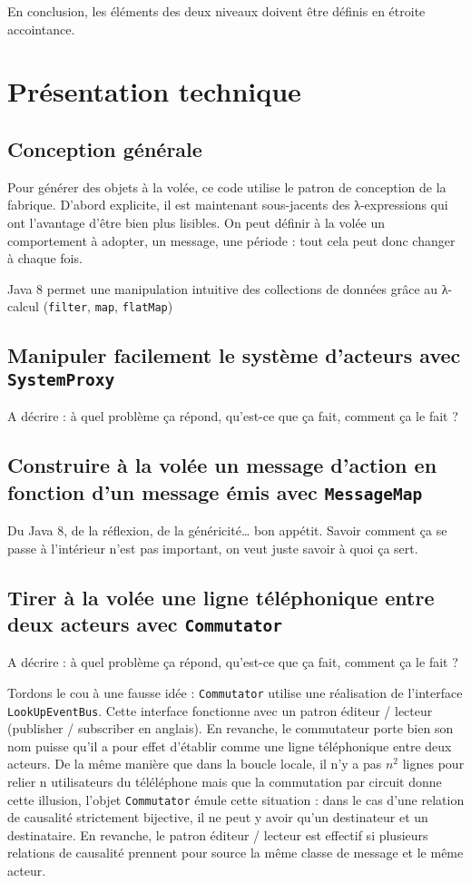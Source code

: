 \documentclass[11pt]{article}
\begin{document}
En conclusion, les éléments des deux niveaux doivent être définis en étroite accointance.

\section{Présentation technique}

\subsection{Conception générale}

Pour générer des objets à la volée, ce code utilise le patron de conception de la fabrique. D'abord explicite, il est maintenant sous-jacents des λ-expressions qui ont l'avantage d'être bien plus lisibles. On peut définir à la volée un comportement à adopter, un message, une période : tout cela peut donc changer à chaque fois. 

Java 8 permet une manipulation intuitive des collections de données grâce au λ-calcul (\texttt{filter}, \texttt{map}, \texttt{flatMap})

\subsection{Manipuler facilement le système d'acteurs avec \texttt{SystemProxy}}

A décrire : à quel problème ça répond, qu'est-ce que ça fait, comment ça le fait ?

\subsection{Construire à la volée un message d'action en fonction d'un message émis avec \texttt{MessageMap}}

Du Java 8, de la réflexion, de la généricité… bon appétit. Savoir comment ça se passe à l'intérieur n'est pas important, on veut juste savoir à quoi ça sert.

\subsection{Tirer à la volée une ligne téléphonique entre deux acteurs avec \texttt{Commutator}}

A décrire : à quel problème ça répond, qu'est-ce que ça fait, comment ça le fait ?

Tordons le cou à une fausse idée : \texttt{Commutator} utilise une réalisation de l'interface \texttt{LookUpEventBus}. Cette interface fonctionne avec un patron éditeur / lecteur (\og publisher / subscriber \fg{} en anglais). En revanche, le commutateur porte bien son nom puisse qu'il a pour effet d'établir comme une ligne téléphonique entre deux acteurs. De la même manière que dans la boucle locale, il n'y a pas $n^2$ lignes pour relier n utilisateurs du téléléphone mais que la commutation par circuit donne cette illusion, l'objet \texttt{Commutator} émule cette situation : dans le cas d'une relation de causalité strictement bijective, il ne peut y avoir qu'un destinateur et un destinataire. En revanche, le patron éditeur / lecteur est effectif si plusieurs relations de causalité prennent pour source la même classe de message et le même acteur.
\end{document}
